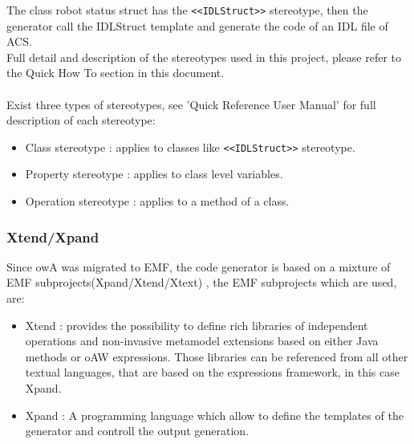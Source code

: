 The class robot status struct has the \verb+<<IDLStruct>>+ stereotype, then the
generator call the IDLStruct template and generate the code of an IDL file of ACS.\\
Full detail and description of the stereotypes used in this project, please
refer to the Quick How To section in this document.\\
\\
Exist three types of stereotypes, see 'Quick Reference User Manual' for full
description of each stereotype:
\begin{itemize}
	\item Class stereotype : applies to classes like \verb+<<IDLStruct>>+
	stereotype.
	\item Property stereotype : applies to class level variables. 
	\item Operation stereotype : applies to a method of a class.
\end{itemize}


\subsubsection{Xtend/Xpand}
Since owA was migrated to EMF, the code generator is based on a mixture of EMF
subprojects(Xpand/Xtend/Xtext) , the EMF subprojects which are used, are:

\begin{itemize}
	\item Xtend : provides the possibility to define rich libraries of independent
	operations and non-invasive metamodel extensions based on either Java methods
	or oAW expressions. Those libraries can be referenced from all other textual
	languages, that are based on the expressions framework, in this case Xpand.
	\item Xpand : A programming language which allow to define the templates of
	the generator and controll the output generation.
\end{itemize}

